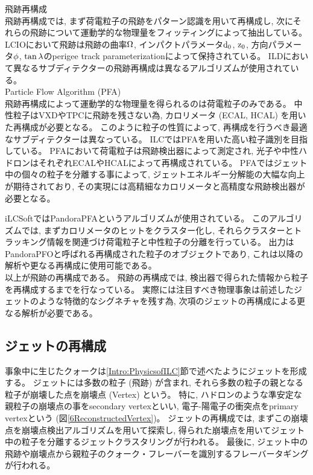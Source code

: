飛跡再構成\\

飛跡再構成では, まず荷電粒子の飛跡をパターン認識を用いて再構成し, 次にそれらの飛跡について運動学的な物理量をフィッティングによって抽出している。
LCIOにおいて飛跡は飛跡の曲率$\rm \Omega$, インパクトパラメータ$\rm d_0$, $\rm z_0$, 方向パラメータ$\rm \phi$, $\rm \tan{\lambda}$のperigee track parameterizationによって保持されている。
ILDにおいて異なるサブディテクターの飛跡再構成は異なるアルゴリズムが使用されている。\\

Particle Flow Algorithm (PFA)\\

飛跡再構成によって運動学的な物理量を得られるのは荷電粒子のみである。
中性粒子はVXDやTPCに飛跡を残さない為, カロリメータ (ECAL, HCAL) を用いた再構成が必要となる。
このように粒子の性質によって, 再構成を行うべき最適なサブディテクターは異なっている。
ILCではPFAを用いた高い粒子識別を目指している。
PFAにおいて荷電粒子は飛跡検出器によって測定され, 光子や中性ハドロンはそれぞれECALやHCALによって再構成されている。
PFAではジェット中の個々の粒子を分離する事によって, ジェットエネルギー分解能の大幅な向上が期待されており, その実現には高精細なカロリメータと高精度な飛跡検出器が必要となる。

iLCSoftではPandoraPFAというアルゴリズムが使用されている。
このアルゴリズムでは, まずカロリメータのヒットをクラスター化し, それらクラスターとトラッキング情報を関連づけ荷電粒子と中性粒子の分離を行っている。
出力はPandoraPFOと呼ばれる再構成された粒子のオブジェクトであり, これは以降の解析や更なる再構成に使用可能である。\\

以上が飛跡の再構成である。
飛跡の再構成では, 検出器で得られた情報から粒子を再構成するまでを行なっている。
実際には注目すべき物理事象は前述したジェットのような特徴的なシグネチャを残す為, 次項のジェットの再構成による更なる解析が必要である。

\newpage
\subsection{ジェットの再構成} \label{Intro:SoftERILC:JetReconstruction}

事象中に生じたクォークは\ref{Intro:PhysicsofILC}節で述べたようにジェットを形成する。
ジェットには多数の粒子 (飛跡) が含まれ, それら多数の粒子の親となる粒子が崩壊した点を崩壊点 (Vertex) という。
特に, ハドロンのような準安定な親粒子の崩壊点の事をsecondary vertexといい, 電子-陽電子の衝突点をprimary vertexという (図\ref{6ReconstructedVertex})。
ジェットの再構成では, まずこの崩壊点を崩壊点検出アルゴリズムを用いて探索し, 得られた崩壊点を用いてジェット中の粒子を分離するジェットクラスタリングが行われる。
最後に, ジェット中の飛跡や崩壊点から親粒子のクォーク・フレーバーを識別するフレーバータギングが行われる。

